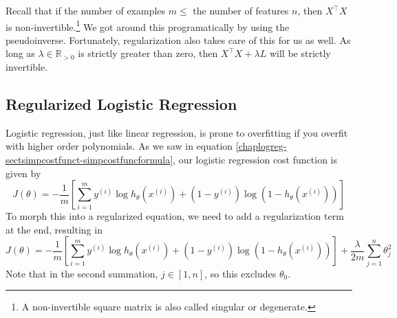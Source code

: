 Recall that if the number of examples $m \leq$ the number of features $n$, then $X^\intercal X$ is non-invertible.\footnote{A non-invertible square matrix is also called singular or degenerate.} We got around this programatically by using the pseudoinverse. Fortunately, regularization also takes care of this for us as well. As long as $\lambda \in \mathbb{R}_{>0}$ is strictly greater than zero, then $X^\intercal X + \lambda L$ will be strictly invertible. 


\subsection{Regularized Logistic Regression}
Logistic regression, just like linear regression, is prone to overfitting if you overfit with higher order polynomials. As we saw in equation \ref{chaplogreg-sectsimpcostfunct-simpcostfuncformula}, our logistic regression cost function is given by
$$
J\left(\theta\right) = -\frac{1}{m} \left[ \sum_{i=1}^m y^{\left(i\right)} \log h_\theta\left(x^{\left(i\right)}\right) + \left(1 - y^{\left(i\right)}\right) \log \left(1 - h_\theta\left(x^{\left(i\right)}\right)\right)\right]
$$
To morph this into a regularized equation, we need to add a regularization term at the end, resulting in
\begin{equation}
J\left(\theta\right) = -\frac{1}{m} \left[ \sum_{i=1}^m y^{\left(i\right)} \log h_\theta\left(x^{\left(i\right)}\right) + \left(1 - y^{\left(i\right)}\right) \log \left(1 - h_\theta\left(x^{\left(i\right)}\right)\right)\right] + \frac{\lambda}{2m}\sum_{j=1}^n \theta_j^2
\end{equation}
Note that in the second summation, $j \in \left[1, n\right]$, so this excludes $\theta_0$. 

